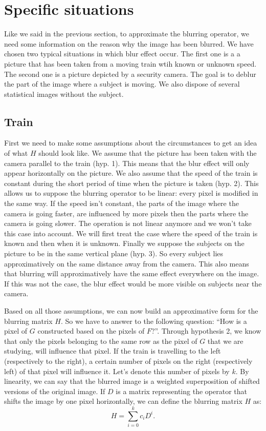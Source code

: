 \section{Specific situations}

Like we said in the previous section, to approximate the blurring operator, we need some information on the reason why the image has been blurred. We have chosen two typical situations in which blur effect occur. The first one is a a picture that has been taken from a moving train wtih known or unknown speed. The second one is a picture depicted by a security camera. The goal is to deblur the part of the image where a subject is moving. We also dispose of several statistical images without the subject.

\subsection{Train}

First we need to make some assumptions about the circumstances to get an idea of what $H$ should look like. We assume that the picture has been taken with the camera parallel to the train (hyp. 1). This means that the blur effect will only appear horizontally on the picture. We also assume that the speed of the train is constant during the short period of time when the picture is taken (hyp. 2). This allows us to suppose the blurring operator to be linear: every pixel is modified in the same way. If the speed isn't constant, the parts of the image where the camera is going faster, are influenced by more pixels then the parts where the camera is going slower. The operation is not linear anymore and we won't take this case into account. We will first treat the case where the speed of the train is known and then when it is unknown. Finally we suppose the subjects on the picture to be in the same vertical plane (hyp. 3). So every subject lies approximatively on the same distance away from the camera. This also means that blurring will approximatively have the same effect everywhere on the image. If this was not the case, the blur effect would be more visible on subjects near the camera.

Based on all those assumptions, we can now build an approximative form for the blurring matrix $H$. So we have to answer to the following question: ``How is a pixel of $G$ constructed based on the pixels of $F$?''. Through hypothesis 2, we know that only the pixels belonging to the same row as the pixel of $G$ that we are studying, will influence that pixel. If the train is travelling to the left (respectively to the right), a certain number of pixels on the right (respectively left) of that pixel will influence it. Let's denote this number of pixels by $k$. By linearity, we can say that the blurred image is a weighted superposition of shifted versions of the original image. If $D$ is a matrix representing the operator that shifts the image by one pixel horizontally, we can define the blurring matrix $H$ as:
\begin{equation}
H=\sum\limits_{i=0}^{k} c_i D^{i}.
\label{eqHtrain}
\end{equation}

